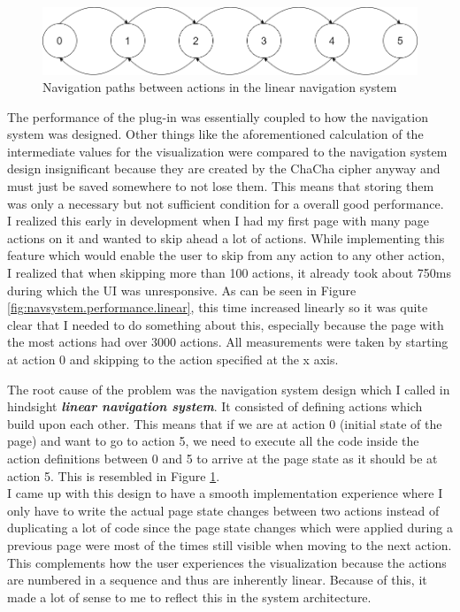\begin{figure}
\centering
\includegraphics[width=\textwidth]{figures/navigationsystem-diagram/navigationsystem-linear-overview.png}
\caption[Navigation paths in linear navigation system]{Navigation paths between actions in the linear navigation system}
\label{fig:navsystem.linear.overview}
\end{figure}

The performance of the plug-in was essentially coupled to how the navigation system was designed. Other things like the aforementioned calculation of the intermediate values for the visualization were compared to the navigation system design insignificant because they are created by the ChaCha cipher anyway and must just be saved somewhere to not lose them. This means that storing them was only a necessary but not sufficient condition for a overall good performance. \\
I realized this early in development when I had my first page with many page actions on it and wanted to skip ahead a lot of actions. While implementing this feature which would enable the user to skip from any action to any other action, I realized that when skipping more than 100 actions, it already took about 750ms during which the UI was unresponsive. As can be seen in Figure \ref{fig:navsystem.performance.linear}, this time increased linearly so it was quite clear that I needed to do something about this, especially because the page with the most actions had over 3000 actions. All measurements were taken by starting at action 0 and skipping to the action specified at the x axis.

The root cause of the problem was the navigation system design which I called in hindsight \textbf{\textit{linear navigation system}}. It consisted of defining actions which build upon each other. This means that if we are at action 0 (initial state of the page) and want to go to action 5, we need to execute all the code inside the action definitions between 0 and 5 to arrive at the page state as it should be at action 5. This is resembled in Figure \ref{fig:navsystem.linear.overview}. \\
I came up with this design to have a smooth implementation experience where I only have to write the actual page state changes between two actions instead of duplicating a lot of code since the page state changes which were applied during a previous page were most of the times still visible when moving to the next action. This complements how the user experiences the visualization because the actions are numbered in a sequence and thus are inherently linear. Because of this, it made a lot of sense to me to reflect this in the system architecture.

